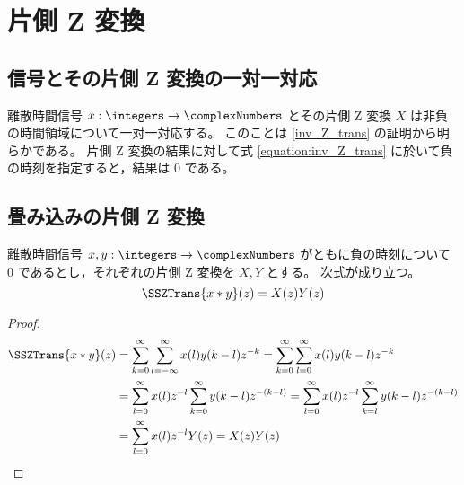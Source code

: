     \chapter{片側 Z 変換}
        \section{信号とその片側 Z 変換の一対一対応}
            離散時間信号 $x:\integers\to\complexNumbers$ とその片側 Z 変換 $X$ は非負の時間領域について一対一対応する。
            このことは \ref{inv_Z_trans} の証明から明らかである。
            片側 Z 変換の結果に対して式 \eqref{equation:inv_Z_trans} に於いて負の時刻を指定すると，結果は 0 である。
        \section{畳み込みの片側 Z 変換}
            \label{single_sided_Z_transform_of_convolution}
            \begin{shadebox}
                離散時間信号 $x,y:\integers\to\complexNumbers$ がともに負の時刻について 0 であるとし，それぞれの片側 Z 変換を $X,Y$ とする。
                次式が成り立つ。
                \[ \SSZTrans{x*y}(z) = X(z)Y(z) \]
            \end{shadebox}
            \begin{proof}
                \begin{align*}
                    \SSZTrans{x*y}(z) &= \sum_{k=0}^\infty \sum_{l=-\infty}^\infty x(l)y(k-l) z^{-k} = \sum_{k=0}^\infty \sum_{l=0}^\infty x(l)y(k-l) z^{-k} \\
                    &= \sum_{l=0}^\infty x(l)z^{-l} \sum_{k=0}^\infty y(k-l) z^{-(k-l)} = \sum_{l=0}^\infty x(l)z^{-l} \sum_{k=l}^\infty y(k-l) z^{-(k-l)} \\
                    &= \sum_{l=0}^\infty x(l)z^{-l} Y(z) = X(z)Y(z)
                \end{align*}
            \end{proof}
